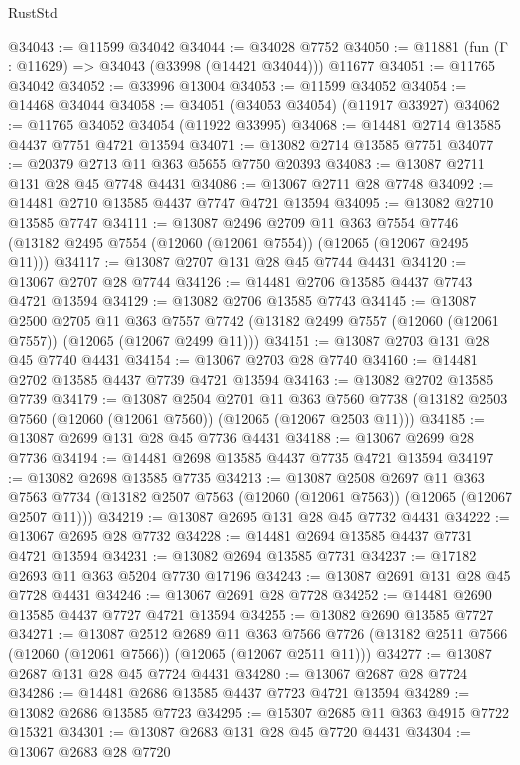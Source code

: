 \begin{lexlean}{RustStd}
\begin{coremodule}
@34043 := @11599 @34042
@34044 := @34028 @7752
@34050 := @11881 (fun (Γ : @11629) => @34043 (@33998 (@14421 @34044))) @11677
@34051 := @11765 @34042
@34052 := @33996 @13004
@34053 := @11599 @34052
@34054 := @14468 @34044
@34058 := @34051 (@34053 @34054) (@11917 @33927)
@34062 := @11765 @34052 @34054 (@11922 @33995)
@34068 := @14481 @2714 @13585 @4437 @7751 @4721 @13594
@34071 := @13082 @2714 @13585 @7751
@34077 := @20379 @2713 @11 @363 @5655 @7750 @20393
@34083 := @13087 @2711 @131 @28 @45 @7748 @4431
@34086 := @13067 @2711 @28 @7748
@34092 := @14481 @2710 @13585 @4437 @7747 @4721 @13594
@34095 := @13082 @2710 @13585 @7747
@34111 := @13087
    @2496
    @2709
    @11
    @363
    @7554
    @7746
    (@13182 @2495 @7554 (@12060 (@12061 @7554)) (@12065 (@12067 @2495 @11)))
@34117 := @13087 @2707 @131 @28 @45 @7744 @4431
@34120 := @13067 @2707 @28 @7744
@34126 := @14481 @2706 @13585 @4437 @7743 @4721 @13594
@34129 := @13082 @2706 @13585 @7743
@34145 := @13087
    @2500
    @2705
    @11
    @363
    @7557
    @7742
    (@13182 @2499 @7557 (@12060 (@12061 @7557)) (@12065 (@12067 @2499 @11)))
@34151 := @13087 @2703 @131 @28 @45 @7740 @4431
@34154 := @13067 @2703 @28 @7740
@34160 := @14481 @2702 @13585 @4437 @7739 @4721 @13594
@34163 := @13082 @2702 @13585 @7739
@34179 := @13087
    @2504
    @2701
    @11
    @363
    @7560
    @7738
    (@13182 @2503 @7560 (@12060 (@12061 @7560)) (@12065 (@12067 @2503 @11)))
@34185 := @13087 @2699 @131 @28 @45 @7736 @4431
@34188 := @13067 @2699 @28 @7736
@34194 := @14481 @2698 @13585 @4437 @7735 @4721 @13594
@34197 := @13082 @2698 @13585 @7735
@34213 := @13087
    @2508
    @2697
    @11
    @363
    @7563
    @7734
    (@13182 @2507 @7563 (@12060 (@12061 @7563)) (@12065 (@12067 @2507 @11)))
@34219 := @13087 @2695 @131 @28 @45 @7732 @4431
@34222 := @13067 @2695 @28 @7732
@34228 := @14481 @2694 @13585 @4437 @7731 @4721 @13594
@34231 := @13082 @2694 @13585 @7731
@34237 := @17182 @2693 @11 @363 @5204 @7730 @17196
@34243 := @13087 @2691 @131 @28 @45 @7728 @4431
@34246 := @13067 @2691 @28 @7728
@34252 := @14481 @2690 @13585 @4437 @7727 @4721 @13594
@34255 := @13082 @2690 @13585 @7727
@34271 := @13087
    @2512
    @2689
    @11
    @363
    @7566
    @7726
    (@13182 @2511 @7566 (@12060 (@12061 @7566)) (@12065 (@12067 @2511 @11)))
@34277 := @13087 @2687 @131 @28 @45 @7724 @4431
@34280 := @13067 @2687 @28 @7724
@34286 := @14481 @2686 @13585 @4437 @7723 @4721 @13594
@34289 := @13082 @2686 @13585 @7723
@34295 := @15307 @2685 @11 @363 @4915 @7722 @15321
@34301 := @13087 @2683 @131 @28 @45 @7720 @4431
@34304 := @13067 @2683 @28 @7720

\end{coremodule}
\end{lexlean}
